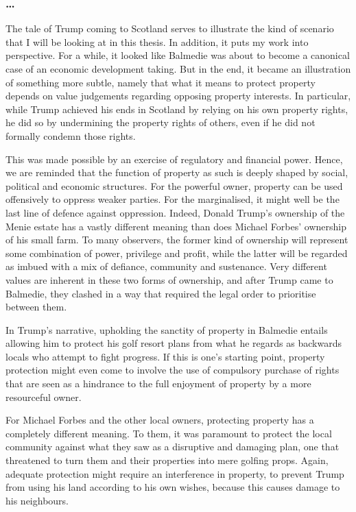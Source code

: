 \subsubsection*{\ldots}

The tale of Trump coming to Scotland serves to illustrate the kind of scenario that I will be looking at in this thesis. In addition, it puts my work into perspective. For a while, it looked like Balmedie was about to become a canonical case of an economic development taking. But in the end, it became an illustration of something more subtle, namely that what it means to protect property depends on value judgements regarding opposing property interests. In particular, while Trump achieved his ends in Scotland by relying on his own property rights, he did so by undermining the property rights of others, even if he did not formally condemn those rights.

This was made possible by an exercise of regulatory and financial power. Hence, we are reminded that the function of property as such is deeply shaped by social, political and economic structures. For the powerful owner, property can be used offensively to oppress weaker parties. For the marginalised, it might well be the last line of defence against oppression. Indeed, Donald Trump's ownership of the Menie estate has a vastly different meaning than does Michael Forbes' ownership of his small farm. To many observers, the former kind of ownership will represent some combination of power, privilege and profit, while the latter will be regarded as imbued with a mix of defiance, community and sustenance. Very different values are inherent in these two forms of ownership, and after Trump came to Balmedie, they clashed in a way that required the legal order to prioritise between them.

In Trump's narrative, upholding the sanctity of property in Balmedie entails allowing him to protect his golf resort plans from what he regards as backwards locals who attempt to fight progress. If this is one's starting point, property protection might even come to involve the use of compulsory purchase of rights that are seen as a hindrance to the full enjoyment of property by a more resourceful owner. 

For Michael Forbes and the other local owners, protecting property has a completely different meaning. To them, it was paramount to protect the local community against what they saw as a disruptive and damaging plan, one that threatened to turn them and their properties into mere golfing props. Again, adequate protection might require an interference in property, to prevent Trump from using his land according to his own wishes, because this causes damage to his neighbours. 

